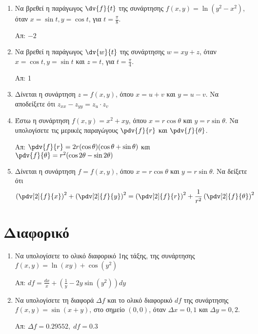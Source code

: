 \begin{enumerate}

  \item Να βρεθεί η παράγωγος $\dv{f}{t}$ της συνάρτησης 
    $f(x,y)=\ln(y^2-x^2)$, όταν $x=\sin t, y=\cos t$, για $t=\frac{\pi}{8}$.

    \hfill Απ: $-2$

  \item Να βρεθεί η παράγωγος $\dv{w}{t}$ της συνάρτησης 
    $ w = xy+z $, όταν $ x = \cos{t}, y = \sin{t}$ και $ z = t $, για 
    $ t = \frac{ \pi }{ 4 } $.

    \hfill Απ: 1

  \item Δίνεται η συνάρτηση $ z=f(x,y) $, όπου $ x=u+v $ και $ y = u-v $. 
    Να αποδείξετε ότι $ z_{xx}-z_{yy} = z_{u}\cdot z_{v} $ 

  \item Έστω η συνάρτηση  $ f(x,y) = x^{2} + xy $, όπου $ x=r \cos{\theta} $ και 
    $ y= r \sin{\theta} $. 
    Να υπολογίσετε τις μερικές παραγώγους $ \pdv{f}{r} $ και $ \pdv{f}{\theta} $.  

    \hfill Απ: 
      $ \pdv{f}{r} = 2r(\cos{\theta} )(\cos{\theta} + \sin{\theta}) $ \; και \; 
      $ \pdv{f}{\theta}=r^{2}(\cos{2\theta} - \sin{2 \theta}) $

  \item Δίνεται η συνάρτηση $ f = f(x,y) $, όπου $ x=r \cos{\theta} $ και 
    $ y= r \sin{\theta} $. Να δείξετε ότι 
    \[
      \left(\pdv[2]{f}{x}\right)^{2} + \left(\pdv[2]{f}{y}\right)^{2} = 
      \left(\pdv[2]{f}{r}\right)^{2} + \frac{1}{r^{2}} 
      \left(\pdv[2]{f}{\theta}\right)^{2}
    \] 


\end{enumerate}

\section*{Διαφορικό}

\begin{enumerate}
  \item Να υπολογίσετε το ολικό διαφορικό 1ης τάξης, της συνάρτησης 
    $f(x,y)=\ln(xy)+\cos(y^2)$ 

    \hfill Απ: $df=\frac{dx}{x}+\left(\frac{1}{y}-2y\sin(y^2)\right)dy$

  \item Να υπολογίσετε τη διαφορά $ \Delta f $ και το ολικό διαφορικό $ df $ της 
    συνάρτησης $ f(x,y) = \sin{(x+y)} $, στο σημείο $ (0,0) $, όταν $ \Delta x = 0,1 $ 
    και $ \Delta y = 0,2 $.

    \hfill Απ: $ \Delta f = 0.29552, \; df = 0.3 $
\end{enumerate}


